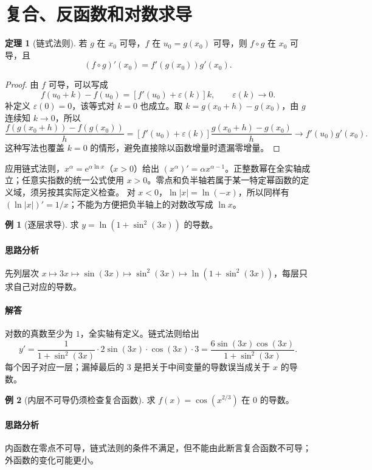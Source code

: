 \documentclass[UTF8,fontset=fandol,12pt,oneside,openany]{ctexrep}
\newcommand{\ee}{\mathrm e}
\theoremstyle{definition}
\newtheorem{theorem}{定理}[chapter]
\newtheorem{example}{例}[chapter]
\begin{document}
\section{复合、反函数和对数求导}
\label{lec:05:chain}

\begin{theorem}[链式法则]
若 $g$ 在 $x_0$ 可导，$f$ 在 $u_0=g(x_0)$ 可导，则 $f\circ g$ 在 $x_0$ 可导，且
\[
 (f\circ g)'(x_0)=f'(g(x_0))g'(x_0).
\]
\end{theorem}
\begin{proof}
由 $f$ 可导，可以写成
\[
 f(u_0+k)-f(u_0)=[f'(u_0)+\varepsilon(k)]k,
 \qquad\varepsilon(k)\to0.
\]
补定义 $\varepsilon(0)=0$，该等式对 $k=0$ 也成立。取
$k=g(x_0+h)-g(x_0)$，由 $g$ 连续知 $k\to0$，所以
\[
 \frac{f(g(x_0+h))-f(g(x_0))}h
 =[f'(u_0)+\varepsilon(k)]\frac{g(x_0+h)-g(x_0)}h
 \longrightarrow f'(u_0)g'(x_0).
\]
这种写法也覆盖 $k=0$ 的情形，避免直接除以函数增量时遗漏零增量。
\end{proof}

应用链式法则，$x^\alpha=\ee^{\alpha\ln x}$（$x>0$）给出
$ (x^\alpha)'=\alpha x^{\alpha-1}$。正整数幂在全实轴成立；任意实指数的统一公式使用 $x>0$。零点和负半轴若属于某一特定幂函数的定义域，须另按其实际定义检查。
对 $x<0$，$\ln|x|=\ln(-x)$，所以同样有 $(\ln|x|)'=1/x$；不能为方便把负半轴上的对数改写成 $\ln x$。

\begin{example}[逐层求导]
求 $y=\ln(1+\sin^2(3x))$ 的导数。
\end{example}
\paragraph{思路分析}先列层次 $x\mapsto3x\mapsto\sin(3x)\mapsto\sin^2(3x)\mapsto\ln(1+\sin^2(3x))$，每层只求自己对应的导数。
\paragraph{解答}对数的真数至少为 $1$，全实轴有定义。链式法则给出
\[
 y'=\frac1{1+\sin^2(3x)}\cdot2\sin(3x)\cdot\cos(3x)\cdot3
 =\frac{6\sin(3x)\cos(3x)}{1+\sin^2(3x)}.
\]
每个因子对应一层；漏掉最后的 $3$ 是把关于中间变量的导数误当成关于 $x$ 的导数。

\begin{example}[内层不可导仍须检查复合函数]
求 $f(x)=\cos(x^{2/3})$ 在 $0$ 的导数。
\end{example}
\paragraph{思路分析}内函数在零点不可导，链式法则的条件不满足，但不能由此断言复合函数不可导；外函数的变化可能更小。
\end{document}
